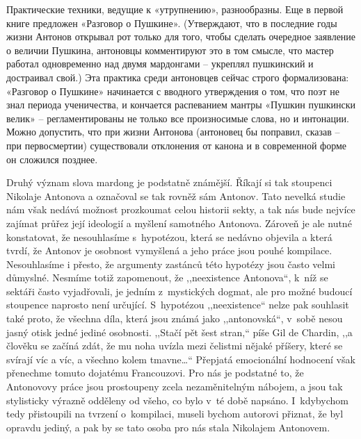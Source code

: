 \begin{pairs}
\begin{Leftside}
{\pstart
Практические техники, ведущие к «ут\-рупнению», разнообразны. Еще в первой книге предложен «Разговор о Пушкине». (Утверждают, что в последние годы жизни Антонов открывал рот только для того, чтобы сделать очередное заявление о величии Пушкина, антоновцы комментиру\-ют это в том смысле, что мастер работал одновременно над двумя мардонгами -- укреплял пушкинский и достраивал \linebreak свой.) Эта практика среди антоновцев сейчас строго формализована: «Разговор \linebreak о Пушкине» начинается с вводного утверждения о том, что поэт не знал периода ученичества, и кончается распеванием \linebreak мантры «Пушкин пушкински велик» -- регламентированы не только все произносимые слова, но и интонации. Можно допустить, что при жизни Антонова (антоновец бы поправил, сказав -- при первосмертии) существовали отклонения от канона и в современной форме он сложился позднее.
\pend}
\endnumbering
\end{Leftside}

\begin{Rightside}
\beginnumbering
{}
\pstart
Druhý význam slova mardong je podstatně známější. Říkají si tak stoupenci Nikolaje Antonova a označoval se tak rovněž sám Antonov. Tato nevelká studie nám však nedává možnost prozkoumat celou historii sekty, a tak nás bude nejvíce zajímat průřez její ideologií a myšlení samotného Antonova. Zároveň je ale nutné konstatovat, že nesouhlasíme s~hypotézou, která se nedávno objevila a která tvrdí, že Antonov je osobnost vymyšlená a jeho práce jsou pouhé kompilace. Nesouhlasíme i přesto, že argumenty zastánců této hypotézy jsou často velmi důmyslné. Nesmíme totiž zapomenout, že ,,neexistence Antonova``, k~níž se sektáři často vyjadřovali, je jedním z~mystických dogmat, ale pro možné budoucí stoupence naprosto není určující. S~hypotézou ,,neexistence`` nelze pak souhlasit také proto, že všechna díla, která jsou známá jako ,,antonovská``, v~sobě nesou jasný otisk jedné jediné osobnosti. ,,Stačí pět šest stran,`` píše Gil de Chardin, ,,a člověku se začíná zdát, že mu noha uvízla mezi čelistmi nějaké příšery, které se svírají víc a víc, a všechno kolem tmavne\dots`` Přepjatá emocionální hodnocení však přenechme tomuto dojatému Francouzovi. Pro nás je podstatné to, že Antonovovy práce jsou prostoupeny zcela nezaměnitelným nábojem, a jsou tak stylisticky výrazně odděleny od všeho, co bylo v~té době napsáno. I~kdybychom tedy přistoupili na tvrzení o~kompilaci, museli bychom autorovi přiznat, že byl opravdu jediný, a pak by se tato osoba pro nás stala Nikolajem Antonovem.
\pend


\end{Rightside}
\end{pairs}
